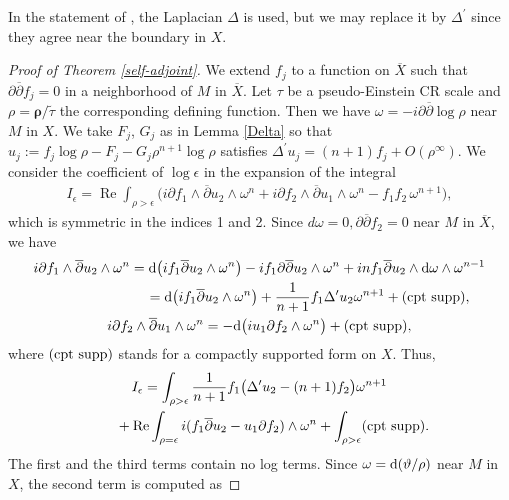 \documentclass[10pt,a4paper]{amsart}
\numberwithin{equation}{section}
\begin{document}
In the statement of \cite[Lemma~4.4]{Hirachi}, the Laplacian $\Delta$ is used, but we may replace it by $\Delta^\prime$ since they agree near the boundary in $X$.


\begin{proof}[Proof of Theorem \ref{self-adjoint}]
We extend $f_j$ to a function on $\overline X$ such that $\partial\overline{\partial}f_j=0$ in a neighborhood of $M$ in $\overline X$. Let
$\tau$ be a pseudo-Einstein CR scale and $\rho=\boldsymbol\rho/\widetilde\tau$ the corresponding def\/ining function.
Then we have $\omega=-i\partial\overline{\partial}\log\rho$ near $M$ in $X$.
We take $F_j$, $G_j$ as in Lemma \ref{Delta} so that $u_j:=f_j\log\rho-F_j-G_j\rho^{n+1}\log\rho$ satisf\/ies $\Delta^\prime u_j=(n+1)f_j+O(\rho^\infty)$. We consider the coef\/f\/icient of $\log\epsilon$ in the expansion of the integral
\begin{gather*}
I_\epsilon=\operatorname{Re}\int_{\rho>\epsilon}\bigl(i\partial f_1\wedge \overline{\partial}u_2\wedge\omega^n+
i\partial f_2\wedge \overline{\partial}u_1\wedge\omega^n-f_1f_2\,\omega^{n+1}\bigr),
\end{gather*}
which is symmetric in the indices 1 and 2. Since $d\omega=0, \partial\overline{\partial}f_2=0$ near $M$ in $\overline X$, we have
\begin{gather*}
i\partial f_1 \wedge\overline{\partial}u_2\wedge\omega^n = {\rm d}\big(if_1\overline{\partial}u_2\wedge\omega^n\big) -if_1\partial\overline{\partial}u_2\wedge \omega^n+inf_1\overline{\partial}u_2\wedge {\rm d}\omega \wedge \omega^{n-1} \\
\hphantom{i\partial f_1 \wedge\overline{\partial}u_2\wedge\omega^n }{}
 ={\rm d}\big(if_1 \overline{\partial}u_2\wedge\omega^n\big)+\frac{1}{n+1}f_1\Delta^\prime u_2 \omega^{n+1}+({\rm cpt\ supp}), \\
i\partial f_2\wedge \overline{\partial}u_1\wedge\omega^n =-{\rm d}\big(iu_1\partial f_2\wedge\omega^n\big)+
({\rm cpt\ supp}),
\end{gather*}
where $({\rm cpt\ supp})$ stands for a compactly supported form on $X$. Thus,
\begin{gather*}
I_\epsilon=\int_{\rho>\epsilon}\frac{1}{n+1}f_1\bigl(\Delta^\prime u_2-(n+1)f_2\bigr)\omega^{n+1} \\
\hphantom{I_\epsilon=}{} +\operatorname{Re}\int_{\rho=\epsilon} i(f_1\overline{\partial}u_2-u_1\partial f_2)\wedge\omega^n
+\int_{\rho>\epsilon}({\rm cpt\ supp}).
\end{gather*}
The f\/irst and the third terms contain no log terms. Since $\omega={\rm d}(\vartheta/\rho)$ near $M$ in $X$, the second term is computed as

\end{proof}
\end{document}
